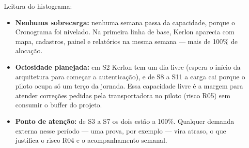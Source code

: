 \documentclass[11pt,a4paper]{article}
\begin{document}
\begin{center}
\end{center}

\noindent Leitura do histograma:
\begin{itemize}[itemsep=2pt]
  \item \textbf{Nenhuma sobrecarga:} nenhuma semana passa da capacidade, porque o Cronograma foi nivelado. Na primeira linha de base, Kerlon aparecia com mapa, cadastros, painel e relatórios na mesma semana --- mais de 100\% de alocação.
  \item \textbf{Ociosidade planejada:} em S2 Kerlon tem um dia livre (espera o início da arquitetura para começar a autenticação), e de S8 a S11 a carga cai porque o piloto ocupa só um terço da jornada. Essa capacidade livre é a margem para atender correções pedidas pela transportadora no piloto (risco R05) sem consumir o buffer do projeto.
  \item \textbf{Ponto de atenção:} de S3 a S7 os dois estão a 100\%. Qualquer demanda externa nesse período --- uma prova, por exemplo --- vira atraso, o que justifica o risco R04 e o acompanhamento semanal.
\end{itemize}
\end{document}
